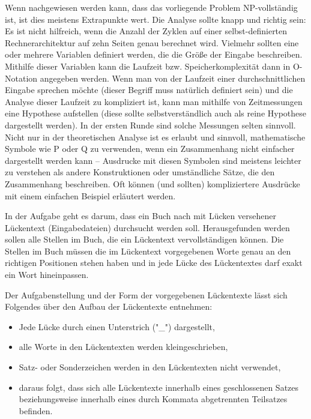 \documentclass[a4paper,10pt,ngerman]{scrartcl}
\begin{document}
	Wenn nachgewiesen werden kann, dass das vorliegende Problem NP-vollständig ist, ist dies meistens Extrapunkte wert.
	Die Analyse sollte knapp und richtig sein: Es ist nicht hilfreich, wenn die Anzahl der Zyklen auf einer selbst-definierten Rechnerarchitektur auf zehn Seiten genau berechnet wird.
	Vielmehr sollten eine oder mehrere Variablen definiert werden, die die Größe der Eingabe beschreiben.
	Mithilfe dieser Variablen kann die Laufzeit bzw. Speicherkomplexität dann in O-Notation angegeben werden.
	Wenn man von der Laufzeit einer durchschnittlichen Eingabe sprechen möchte (dieser Begriff muss natürlich definiert sein) und die Analyse dieser Laufzeit zu kompliziert ist, kann man mithilfe von Zeitmessungen eine Hypothese aufstellen (diese sollte selbstverständlich auch als reine Hypothese dargestellt werden).
	In der ersten Runde sind solche Messungen selten sinnvoll.
	Nicht nur in der theoretischen Analyse ist es erlaubt und sinnvoll, mathematische Symbole wie P oder Q zu verwenden, wenn ein Zusammenhang nicht einfacher dargestellt werden kann – Ausdrucke mit diesen Symbolen sind meistens leichter zu verstehen als andere Konstruktionen oder umständliche Sätze, die den Zusammenhang beschreiben.
	Oft können (und sollten) kompliziertere Ausdrücke mit einem einfachen Beispiel erläutert werden.

    	In der Aufgabe geht es darum, dass ein Buch nach mit Lücken versehener Lückentext (Eingabedateien) durchsucht werden soll.
		Herausgefunden werden sollen alle Stellen im Buch, die ein Lückentext vervollständigen können.
		Die Stellen im Buch müssen die im Lückentext vorgegebenen Worte genau an den richtigen Positionen stehen haben und in jede Lücke des Lückentextes darf exakt ein Wort hineinpassen.

		Der Aufgabenstellung und der Form der vorgegebenen Lückentexte lässt sich Folgendes über den Aufbau der Lückentexte entnehmen:
		\begin{itemize}
			\item Jede Lücke durch einen Unterstrich ("\_") dargestellt,
			\item alle Worte in den Lückentexten werden kleingeschrieben,
			\item Satz- oder Sonderzeichen werden in den Lückentexten nicht verwendet,
			\item daraus folgt, dass sich alle Lückentexte innerhalb eines geschlossenen Satzes beziehungsweise innerhalb eines durch Kommata abgetrennten Teilsatzes befinden.
		\end{itemize}
\end{document}
